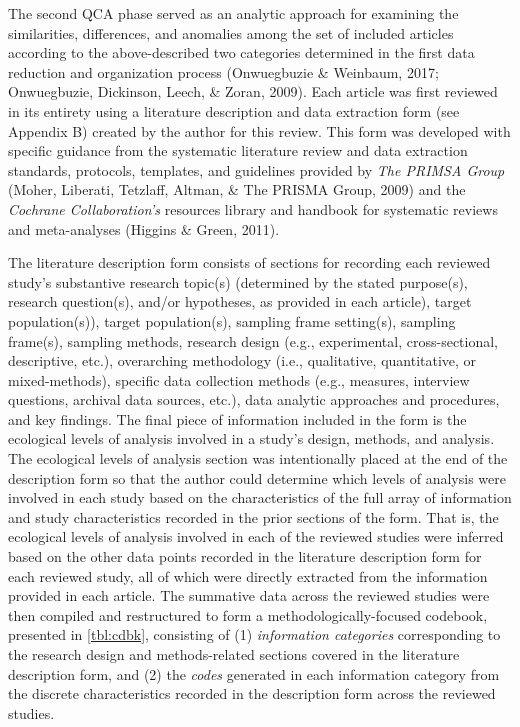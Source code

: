 \documentclass[11pt,]{tufte-book}
\begin{document}
The second QCA phase served as an analytic approach for examining the
similarities, differences, and anomalies among the set of included
articles according to the above-described two categories determined in
the first data reduction and organization process (Onwuegbuzie \&
Weinbaum, 2017; Onwuegbuzie, Dickinson, Leech, \& Zoran, 2009). Each
article was first reviewed in its entirety using a literature
description and data extraction form (see Appendix B) created by the
author for this review. This form was developed with specific guidance
from the systematic literature review and data extraction standards,
protocols, templates, and guidelines provided by \emph{The PRIMSA Group}
(Moher, Liberati, Tetzlaff, Altman, \& The PRISMA Group, 2009) and the
\emph{Cochrane Collaboration's} resources library and handbook for
systematic reviews and meta-analyses (Higgins \& Green, 2011).

The literature description form consists of sections for recording each
reviewed study's substantive research topic(s) (determined by the stated
purpose(s), research question(s), and/or hypotheses, as provided in each
article), target population(s)), target population(s), sampling frame
setting(s), sampling frame(s), sampling methods, research design (e.g.,
experimental, cross-sectional, descriptive, etc.), overarching
methodology (i.e., qualitative, quantitative, or mixed-methods),
specific data collection methods (e.g., measures, interview questions,
archival data sources, etc.), data analytic approaches and procedures,
and key findings. The final piece of information included in the form is
the ecological levels of analysis involved in a study's design, methods,
and analysis. The ecological levels of analysis section was
intentionally placed at the end of the description form so that the
author could determine which levels of analysis were involved in each
study based on the characteristics of the full array of information and
study characteristics recorded in the prior sections of the form. That
is, the ecological levels of analysis involved in each of the reviewed
studies were inferred based on the other data points recorded in the
literature description form for each reviewed study, all of which were
directly extracted from the information provided in each article. The
summative data across the reviewed studies were then compiled and
restructured to form a methodologically-focused codebook, presented in
\cref{tbl:cdbk}, consisting of (1) \emph{information
categories} corresponding to the research design and methods-related
sections covered in the literature description form, and (2) the
\emph{codes} generated in each information category from the discrete
characteristics recorded in the description form across the reviewed
studies.
\end{document}
